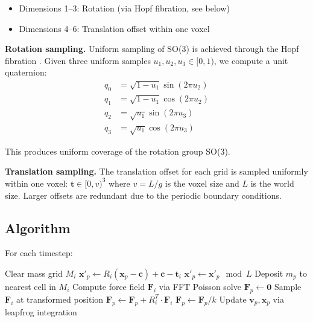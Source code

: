 \documentclass[11pt,twocolumn]{article}
\begin{document}
\begin{itemize}
    \item Dimensions 1--3: Rotation (via Hopf fibration, see below)
    \item Dimensions 4--6: Translation offset within one voxel
\end{itemize}

\textbf{Rotation sampling.} Uniform sampling of SO(3) is achieved through the Hopf fibration \cite{shoemake1992}. Given three uniform samples $u_1, u_2, u_3 \in [0,1)$, we compute a unit quaternion:
\begin{align}
q_0 &= \sqrt{1-u_1} \sin(2\pi u_2) \\
q_1 &= \sqrt{1-u_1} \cos(2\pi u_2) \\
q_2 &= \sqrt{u_1} \sin(2\pi u_3) \\
q_3 &= \sqrt{u_1} \cos(2\pi u_3)
\end{align}

This produces uniform coverage of the rotation group SO(3).

\textbf{Translation sampling.} The translation offset for each grid is sampled uniformly within one voxel: $\mathbf{t} \in [0, v)^3$ where $v = L/g$ is the voxel size and $L$ is the world size. Larger offsets are redundant due to the periodic boundary conditions.

\subsection{Algorithm}

For each timestep:

\begin{algorithm}[H]
\caption{Fast Ensemble Grid Method}
\begin{algorithmic}[1]
    \State Clear mass grid $M_i$
        \State $\mathbf{x}'_p \gets R_i(\mathbf{x}_p - \mathbf{c}) + \mathbf{c} - \mathbf{t}_i$ 
        \State $\mathbf{x}'_p \gets \mathbf{x}'_p \mod L$ 
        \State Deposit $m_p$ to nearest cell in $M_i$
    \EndFor
    \State Compute force field $\mathbf{F}_i$ via FFT Poisson solve
\EndFor
{}
    \State $\mathbf{F}_p \gets \mathbf{0}$
        \State Sample $\mathbf{F}_i$ at transformed position
        \State $\mathbf{F}_p \gets \mathbf{F}_p + R_i^T \cdot \mathbf{F}_i$ 
    \EndFor
    \State $\mathbf{F}_p \gets \mathbf{F}_p / k$ 
    \State Update $\mathbf{v}_p, \mathbf{x}_p$ via leapfrog integration
\EndFor
\end{algorithmic}
\end{algorithm}
\end{document}
